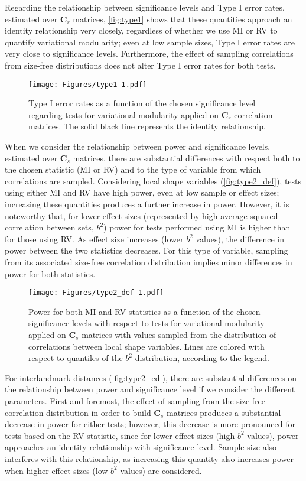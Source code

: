 \documentclass[12pt,]{article}
\begin{document}
Regarding the relationship between significance levels and Type I error
rates, estimated over $\mathbf{C}_r$ matrices, \autoref{fig:type1} shows
that these quantities approach an identity relationship very closely,
regardless of whether we use MI or RV to quantify variational
modularity; even at low sample sizes, Type I error rates are very close
to significance levels. Furthermore, the effect of sampling correlations
from size-free distributions does not alter Type I error rates for both
tests.

\begin{figure}[htbp]
\centering
\texttt{[image: Figures/type1-1.pdf]}
\caption{Type I error rates as a function of the chosen significance
level regarding tests for variational modularity applied on
$\mathbf{C}_r$ correlation matrices. The solid black line represents the
identity relationship. \label{fig:type1}}
\end{figure}

When we consider the relationship between power and significance levels,
estimated over $\mathbf{C}_s$ matrices, there are substantial
differences with respect both to the chosen statistic (MI or RV) and to
the type of variable from which correlations are sampled. Considering
local shape variables (\autoref{fig:type2_def}), tests using either MI
and RV have high power, even at low sample or effect sizes; increasing
these quantities produces a further increase in power. However, it is
noteworthy that, for lower effect sizes (represented by high average
squared correlation between sets, $b^2$) power for tests performed using
MI is higher than for those using RV. As effect size increases (lower
$b^2$ values), the difference in power between the two statistics
decreases. For this type of variable, sampling from its associated
size-free correlation distribution implies minor differences in power
for both statistics.

\begin{figure}[htbp]
\centering
\texttt{[image: Figures/type2\_def-1.pdf]}
\caption{Power for both MI and RV statistics as a function of the chosen
significance levels with respect to tests for variational modularity
applied on $\mathbf{C}_s$ matrices with values sampled from the
distribution of correlations between local shape variables. Lines are
colored with respect to quantiles of the $b^2$ distribution, according
to the legend. \label{fig:type2_def}}
\end{figure}

For interlandmark distances (\autoref{fig:type2_ed}), there are
substantial differences on the relationship between power and
significance level if we consider the different parameters. First and
foremost, the effect of sampling from the size-free correlation
distribution in order to build $\mathbf{C}_s$ matrices produces a
substantial decrease in power for either tests; however, this decrease
is more pronounced for tests based on the RV statistic, since for lower
effect sizes (high $b^2$ values), power approaches an identity
relationship with significance level. Sample size also interferes with
this relationship, as increasing this quantity also increases power when
higher effect sizes (low $b^2$ values) are considered.
\end{document}
